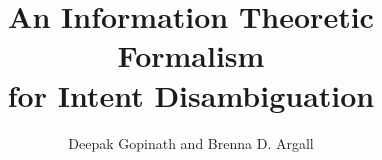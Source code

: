 \documentclass[conference]{IEEEtran}
\begin{document}
\title{An Information Theoretic Formalism \\for Intent Disambiguation}
\author{Deepak Gopinath and Brenna D. Argall}




% 
%	
%	
%	
%	

\maketitle
\end{document}
